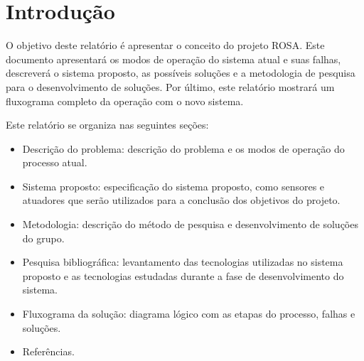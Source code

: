


\section{Introdução}
O objetivo deste relatório é apresentar o conceito do projeto ROSA. Este documento apresentará os modos de operação do sistema atual e suas falhas, descreverá o sistema proposto, as possíveis soluções e a metodologia de pesquisa para o desenvolvimento de soluções. Por último, este relatório mostrará um fluxograma completo da operação com o novo sistema.

Este relatório se organiza nas seguintes seções:
    \begin{itemize}
        \item Descrição do problema: descrição do problema e os modos de operação do processo atual.
        \item Sistema proposto: especificação do sistema proposto, como sensores e atuadores que serão utilizados para a conclusão dos objetivos do projeto.
        \item Metodologia: descrição do método de pesquisa e desenvolvimento de soluções do grupo.
        \item Pesquisa bibliográfica: levantamento das tecnologias utilizadas no sistema proposto e as tecnologias estudadas durante a fase de desenvolvimento do sistema.
        \item Fluxograma da solução: diagrama lógico com as etapas do processo, falhas e soluções.
        \item Referências.
    \end{itemize}